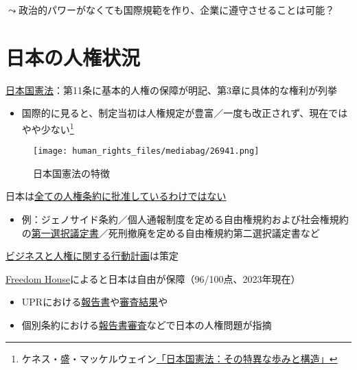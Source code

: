 \documentclass[
  xelatex,
  ja=standard]{bxjsarticle}
\providecommand{\tightlist}{%
  \setlength{\itemsep}{0pt}\setlength{\parskip}{0pt}}\usepackage{longtable,booktabs,array}
\begin{document}
\(\leadsto\)政治的パワーがなくても国際規範を作り、企業に遵守させることは可能？

\hypertarget{ux65e5ux672cux306eux4ebaux6a29ux72b6ux6cc1}{%
\section{日本の人権状況}\label{ux65e5ux672cux306eux4ebaux6a29ux72b6ux6cc1}}

\href{https://elaws.e-gov.go.jp/document?lawid=321CONSTITUTION}{日本国憲法}：第11条に基本的人権の保障が明記、第3章に具体的な権利が列挙

\begin{itemize}
\tightlist
\item
  国際的に見ると、制定当初は人権規定が豊富／一度も改正されず、現在ではやや少ない\footnote{ケネス・盛・マッケルウェイン\href{https://www.nippon.com/ja/in-depth/a05602/}{「日本国憲法：その特異な歩みと構造」}}
\end{itemize}

\begin{figure}[htpb]

{\centering \texttt{[image: human\_rights\_files/mediabag/26941.png]}

}

\caption{日本国憲法の特徴}

\end{figure}

日本は\href{https://www.hurights.or.jp/archives/treaty/un-treaty-list.html}{全ての人権条約に批准しているわけではない}

\begin{itemize}
\tightlist
\item
  例：ジェノサイド条約／個人通報制度を定める自由権規約および社会権規約の\href{https://www.nichibenren.or.jp/activity/international/library/human_rights/liberty_protocols_no1.html}{第一選択議定書}／死刑撤廃を定める自由権規約第二選択議定書など
\end{itemize}

\href{https://www.mofa.go.jp/mofaj/gaiko/bhr/index.html}{ビジネスと人権に関する行動計画}は策定

\href{https://freedomhouse.org/country/japan/freedom-world/2023}{Freedom
House}によると日本は自由が保障（96/100点、2023年現在）

\begin{itemize}
\tightlist
\item
  UPRにおける\href{https://www.nichibenren.or.jp/activity/international/library/upr.html}{報告書}や\href{https://www.mofa.go.jp/mofaj/gaiko/jinken_r/upr_gai.html}{審査結果}や
\item
  個別条約における\href{https://www.nichibenren.or.jp/activity/international/library/human_rights.html}{報告書審査}などで日本の人権問題が指摘
\end{itemize}
\end{document}
